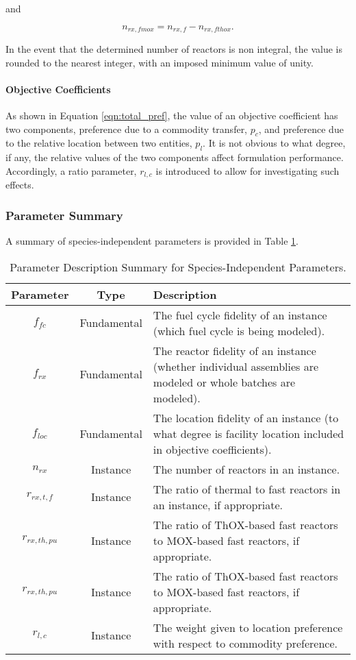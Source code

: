 and

\begin{equation}
n_{rx, fmox} = n_{rx, f} - n_{rx, fthox}.
\end{equation}

In the event that the determined number of reactors is non integral, the value
is rounded to the nearest integer, with an imposed minimum value of unity.

\paragraph{Objective Coefficients}

As shown in Equation \ref{eqn:total_pref}, the value of an objective coefficient
has two components, preference due to a commodity transfer, $p_c$, and
preference due to the relative location between two entities, $p_l$. It is not
obvious to what degree, if any, the relative values of the two components affect
formulation performance. Accordingly, a ratio parameter, $r_{l, c}$ is
introduced to allow for investigating such effects.

\subsubsection{Parameter Summary}

A summary of species-independent parameters is provided in Table
\ref{tbl:global_params}.

\begin{table}[h]
\centering
\caption{Parameter Description Summary for Species-Independent Parameters.}
\label{tbl:global_params}
\begin{tabularx}{\columnwidth-10pt}{|c|c|X|} %
\hline
Parameter    & Type &
Description
\\ \hline
$f_{fc}$     & Fundamental &
The fuel cycle fidelity of an instance (which fuel cycle is being modeled).
\\ \hline
$f_{rx}$   & Fundamental &
The reactor fidelity of an instance (whether individual assemblies are modeled
or whole batches are modeled).  
\\ \hline
$f_{loc}$    & Fundamental &
The location fidelity of an instance (to what degree is facility location
included in objective coefficients).
\\ \hline
$n_{rx}$   & Instance &
The number of reactors in an instance.
\\ \hline
$r_{rx, t, f}$   & Instance &
The ratio of thermal to fast reactors in an instance, if appropriate.
\\ \hline
$r_{rx, th, pu}$ & Instance &
The ratio of ThOX-based fast reactors to MOX-based fast reactors, if appropriate.
\\ \hline
$r_{rx, th, pu}$ & Instance &
The ratio of ThOX-based fast reactors to MOX-based fast reactors, if appropriate.
\\ \hline
$r_{l, c}$ & Instance &
The weight given to location preference with respect to commodity preference.
\\ \hline
\end{tabularx}
\end{table}

